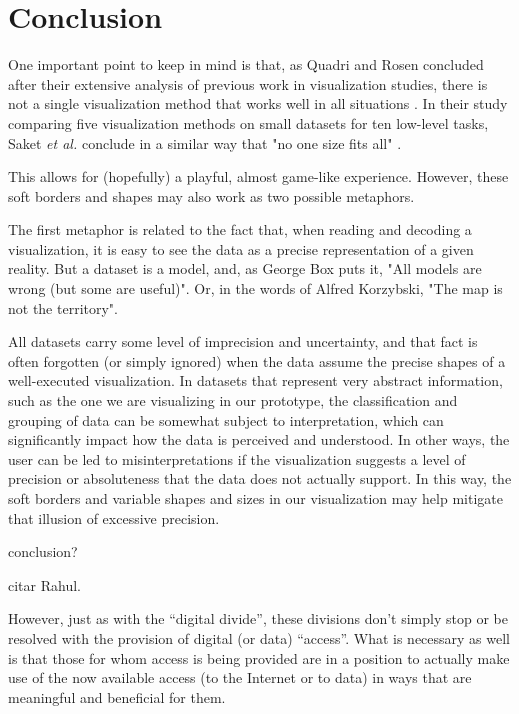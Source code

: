\documentclass[manuscript, screen]{timtm}
\begin{document}
\section{Conclusion}

One important point to keep in mind is that, as Quadri and Rosen concluded after their extensive analysis of previous work in visualization studies, there is not a single visualization method that works well in all situations \cite{QuadriGhulamJilani2022ASoP}. In their study comparing five visualization methods on small datasets for ten low-level tasks, Saket \textit{et al.} conclude in a similar way that "no one size fits all" \cite{SaketBahador2019TEoB}.

This allows for (hopefully) a playful, almost game-like experience. However, these soft borders and shapes may also work as two possible metaphors.

The first metaphor is related to the fact that, when reading and decoding a visualization, it is easy to see the data as a precise representation of a given reality. But a dataset is a model, and, as George Box puts it, "All models are wrong (but some are useful)". Or, in the words of Alfred Korzybski, "The map is not the territory". 

All datasets carry some level of imprecision and uncertainty, and that fact is often forgotten (or simply ignored) when the data assume the precise shapes of a well-executed visualization. In datasets that represent very abstract information, such as the one we are visualizing in our prototype, the classification and grouping of data can be somewhat subject to interpretation, which can significantly impact how the data is perceived and understood. In other ways, the user can be led to misinterpretations if the visualization suggests a level of precision or absoluteness that the data does not actually support. In this way, the soft borders and variable shapes and sizes in our visualization may help mitigate that illusion of excessive precision.


conclusion?

citar Rahul.

However, just as with the “digital divide”, these divisions don’t simply stop or be resolved with the provision of digital (or data) “access”. What is necessary as well is that those for whom access is being provided are in a position to actually make use of the now available access (to the Internet or to data) in ways that are meaningful and beneficial for them. \cite{Gurstein_2011-open-data-use}
\end{document}
